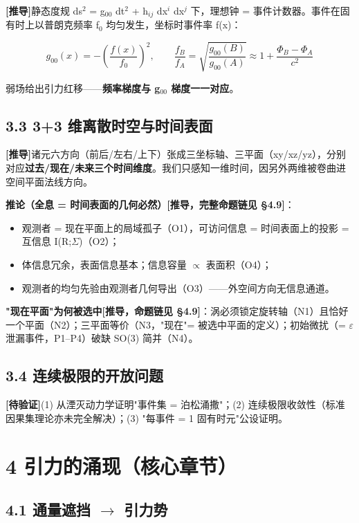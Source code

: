 \documentclass[12pt]{article}
\newcommand{\mtag}[1]{\textbf{[#1]}}
\newcommand{\up}[1]{\ensuremath{^{#1}}}
\newcommand{\down}[1]{\ensuremath{_{#1}}}
\begin{document}
\mtag{推导}静态度规 ds\up{2} = g\down{00} dt\up{2} + h\down{ij} dx\up{i} dx\up{j} 下，理想钟 = 事件计数器。事件在固有时上以普朗克频率 f\down{0} 均匀发生，坐标时事件率 f(x)：

\[g_{00}(x) = -\left(\frac{f(x)}{f_0}\right)^2,\qquad \frac{f_B}{f_A} = \sqrt{\frac{g_{00}(B)}{g_{00}(A)}} \approx 1 + \frac{\Phi_B - \Phi_A}{c^2}\]

弱场给出引力红移------\textbf{频率梯度与 g\down{00} 梯度一一对应}。

\subsection{3.3 3+3 维离散时空与时间表面}

\mtag{推导}诸元六方向（前后/左右/上下）张成三坐标轴、三平面（xy/xz/yz），分别对应\textbf{过去/现在/未来三个时间维度}。我们只感知一维时间，因另外两维被卷曲进空间平面法线方向。

\textbf{推论（全息 = 时间表面的几何必然）}\mtag{推导，完整命题链见 \S{}4.9}：
\begin{itemize}
\item 观测者 = 现在平面上的局域孤子（O1），可访问信息 = 时间表面上的投影 = 互信息 I(R;\ensuremath{\Sigma})（O2）；
\item 体信息冗余，表面信息基本；信息容量 \ensuremath{\propto} 表面积（O4）；
\item 观测者的均匀先验由观测者几何导出（O3）------外空间方向无信息通道。
\end{itemize}

\textbf{"现在平面"为何被选中}\mtag{推导，命题链见 \S{}4.9}：涡必须锁定旋转轴（N1）且恰好一个平面（N2）；三平面等价（N3，"现在"= 被选中平面的定义）；初始微扰（= \ensuremath{\varepsilon} 泄漏事件，P1--P4）破缺 SO(3) 简并（N4）。

\subsection{3.4 连续极限的开放问题}

\mtag{待验证}(1) 从湮灭动力学证明"事件集 = 泊松涌撒"；(2) 连续极限收敛性（标准因果集理论亦未完全解决）；(3) "每事件 = 1 固有时元"公设证明。



\section{4 引力的涌现（核心章节）}

\subsection{4.1 通量遮挡 \ensuremath{\to} 引力势}
\end{document}
